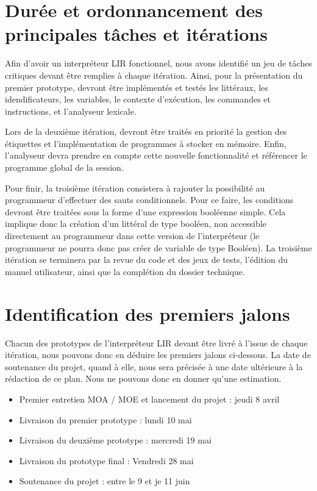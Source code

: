 \section{Durée et ordonnancement des principales tâches et itérations}

Afin d'avoir un interpréteur LIR fonctionnel, nous avons identifié un jeu de
tâches critiques devant être remplies à chaque itération. Ainsi, pour la
présentation du premier prototype, devront être implémentés et testés les
littéraux, les idendificateurs, les variables, le contexte d'exécution, les
commandes et instructions, et l'analyseur lexicale.

Lors de la deuxième itération, devront être traités en priorité la gestion des
étiquettes et l'implémentation de programmes à stocker en mémoire. Enfin,
l'analyseur devra prendre en compte cette nouvelle fonctionnalité et référencer
le programme global de la session.

Pour finir, la troisième itération consistera à rajouter la possibilité au
programmeur d'effectuer des sauts conditionnels. Pour ce faire, les conditions
devront être traitées sous la forme d'une expression booléenne simple. Cela
implique donc la création d'un littéral de type booléen, non accessible directement
au programmeur dans cette version de l'interpréteur (le programmeur ne pourra donc
pas créer de variable de type Booléen). La troisième itération se terminera par
la revue du code et des jeux de tests, l'édition du manuel utilisateur, ainsi que
la complétion du dossier technique.

\section{Identification des premiers jalons}
Chacun des prototypes de l'interpréteur LIR devant être livré à l'issue de chaque
itération, nous pouvons donc en déduire les premiers jalons ci-dessous. La date de
soutenance du projet, quand à elle, nous sera précisée à une date ultérieure à
la rédaction de ce plan. Nous ne pouvons donc en donner qu'une estimation.

\begin{itemize}
    \item Premier entretien MOA / MOE et lancement du projet :
          jeudi 8 avril
    \item Livraison du premier prototype : lundi 10 mai
    \item Livraison du deuxième prototype : mercredi 19 mai
    \item Livraison du prototype final : Vendredi 28 mai
    \item Soutenance du projet : entre le 9 et je 11 juin
\end{itemize}

